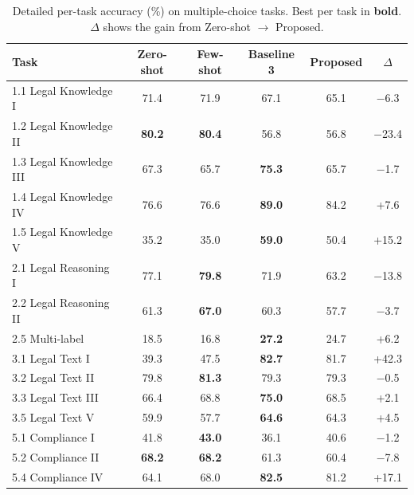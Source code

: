 \documentclass[11pt,a4paper]{article}
\begin{document}
\begin{table}[htbp]
\centering
\caption{Detailed per-task accuracy (\%) on multiple-choice tasks. Best per task in \textbf{bold}. $\Delta$ shows the gain from Zero-shot $\rightarrow$ Proposed.}
\label{tab:mc_detail}
\begin{tabular}{@{}lccccc@{}}
\toprule
\textbf{Task} & \textbf{Zero-shot} & \textbf{Few-shot} & \textbf{Baseline 3} & \textbf{Proposed} & $\Delta$ \\
\midrule
1.1 Legal Knowledge I    & 71.4 & 71.9 & 67.1 & 65.1 & $-$6.3 \\
1.2 Legal Knowledge II   & \textbf{80.2} & \textbf{80.4} & 56.8 & 56.8 & $-$23.4 \\
1.3 Legal Knowledge III  & 67.3 & 65.7 & \textbf{75.3} & 65.7 & $-$1.7 \\
1.4 Legal Knowledge IV   & 76.6 & 76.6 & \textbf{89.0} & 84.2 & +7.6 \\
1.5 Legal Knowledge V    & 35.2 & 35.0 & \textbf{59.0} & 50.4 & +15.2 \\
\midrule
2.1 Legal Reasoning I    & 77.1 & \textbf{79.8} & 71.9 & 63.2 & $-$13.8 \\
2.2 Legal Reasoning II   & 61.3 & \textbf{67.0} & 60.3 & 57.7 & $-$3.7 \\
2.5 Multi-label          & 18.5 & 16.8 & \textbf{27.2} & 24.7 & +6.2 \\
\midrule
3.1 Legal Text I         & 39.3 & 47.5 & \textbf{82.7} & 81.7 & +42.3 \\
3.2 Legal Text II        & 79.8 & \textbf{81.3} & 79.3 & 79.3 & $-$0.5 \\
3.3 Legal Text III       & 66.4 & 68.8 & \textbf{75.0} & 68.5 & +2.1 \\
3.5 Legal Text V         & 59.9 & 57.7 & \textbf{64.6} & 64.3 & +4.5 \\
\midrule
5.1 Compliance I         & 41.8 & \textbf{43.0} & 36.1 & 40.6 & $-$1.2 \\
5.2 Compliance II        & \textbf{68.2} & \textbf{68.2} & 61.3 & 60.4 & $-$7.8 \\
5.4 Compliance IV        & 64.1 & 68.0 & \textbf{82.5} & 81.2 & +17.1 \\
\bottomrule
\end{tabular}
\end{table}
\end{document}
